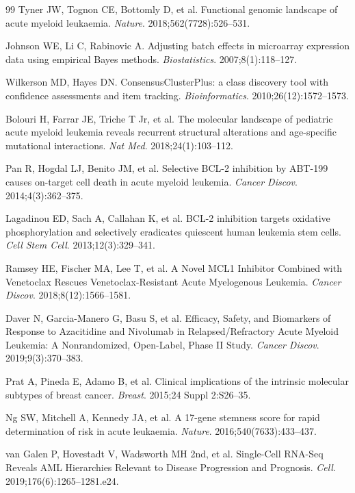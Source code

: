 \documentclass[11pt,a4paper]{article}
\begin{document}
\begin{thebibliography}{99}
Tyner JW, Tognon CE, Bottomly D, et al.
Functional genomic landscape of acute myeloid leukaemia.
\textit{Nature}. 2018;562(7728):526--531.

Johnson WE, Li C, Rabinovic A.
Adjusting batch effects in microarray expression data using empirical Bayes methods.
\textit{Biostatistics}. 2007;8(1):118--127.

Wilkerson MD, Hayes DN.
ConsensusClusterPlus: a class discovery tool with confidence assessments and item tracking.
\textit{Bioinformatics}. 2010;26(12):1572--1573.

Bolouri H, Farrar JE, Triche T Jr, et al.
The molecular landscape of pediatric acute myeloid leukemia reveals recurrent structural alterations and age-specific mutational interactions.
\textit{Nat Med}. 2018;24(1):103--112.

Pan R, Hogdal LJ, Benito JM, et al.
Selective BCL-2 inhibition by ABT-199 causes on-target cell death in acute myeloid leukemia.
\textit{Cancer Discov}. 2014;4(3):362--375.

Lagadinou ED, Sach A, Callahan K, et al.
BCL-2 inhibition targets oxidative phosphorylation and selectively eradicates quiescent human leukemia stem cells.
\textit{Cell Stem Cell}. 2013;12(3):329--341.

Ramsey HE, Fischer MA, Lee T, et al.
A Novel MCL1 Inhibitor Combined with Venetoclax Rescues Venetoclax-Resistant Acute Myelogenous Leukemia.
\textit{Cancer Discov}. 2018;8(12):1566--1581.

Daver N, Garcia-Manero G, Basu S, et al.
Efficacy, Safety, and Biomarkers of Response to Azacitidine and Nivolumab in Relapsed\slash\allowbreak Refractory Acute Myeloid Leukemia: A Nonrandomized, Open-Label, Phase II Study.
\textit{Cancer Discov}. 2019;9(3):370--383.

Prat A, Pineda E, Adamo B, et al.
Clinical implications of the intrinsic molecular subtypes of breast cancer.
\textit{Breast}. 2015;24 Suppl 2:S26--35.

Ng SW, Mitchell A, Kennedy JA, et al.
A 17-gene stemness score for rapid determination of risk in acute leukaemia.
\textit{Nature}. 2016;540(7633):433--437.

van Galen P, Hovestadt V, Wadsworth MH 2nd, et al.
Single-Cell RNA-Seq Reveals AML Hierarchies Relevant to Disease Progression and Prognosis.
\textit{Cell}. 2019;176(6):1265--1281.e24.


\end{thebibliography}
\end{document}
